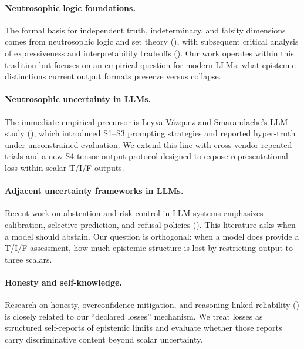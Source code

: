 \paragraph{Neutrosophic logic foundations.}
The formal basis for independent truth, indeterminacy, and falsity
dimensions comes from neutrosophic logic and set theory
(\cite{smarandache2010neutrosophic,smarandache2005unifying}),
with subsequent critical analysis of expressiveness and
interpretability tradeoffs (\cite{rivieccio2008neutrosophic}).
Our work operates within this tradition but focuses on an empirical
question for modern LLMs: what epistemic distinctions current output
formats preserve versus collapse.

\paragraph{Neutrosophic uncertainty in LLMs.}
The immediate empirical precursor is Leyva-Vázquez and Smarandache's
LLM study (\cite{leyva2025neutrosophic}), which introduced S1--S3
prompting strategies and reported hyper-truth under unconstrained
evaluation. We extend this line with cross-vendor repeated trials and a
new S4 tensor-output protocol designed to expose representational loss
within scalar T/I/F outputs.

\paragraph{Adjacent uncertainty frameworks in LLMs.}
Recent work on abstention and risk control in LLM systems emphasizes
calibration, selective prediction, and refusal policies
(\cite{yadkori2024mitigating,tayebati2025learning,machcha2026knowing}).
This literature asks when a model should abstain. Our question is
orthogonal: when a model does provide a T/I/F assessment, how much
epistemic structure is lost by restricting output to three scalars.

\paragraph{Honesty and self-knowledge.}
Research on honesty, overconfidence mitigation, and reasoning-linked
reliability (\cite{li2024survey,yanlearn,ahtisham2026llm})
is closely related to our ``declared losses'' mechanism. We treat losses
as structured self-reports of epistemic limits and evaluate whether
those reports carry discriminative content beyond scalar uncertainty.
